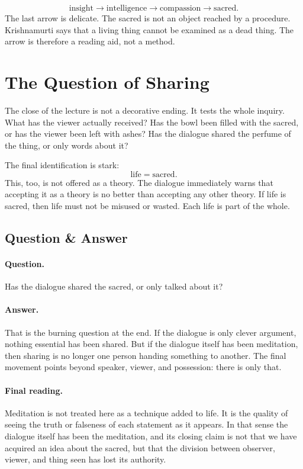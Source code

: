\begin{equation}
\text{insight}
\longrightarrow
\text{intelligence}
\longrightarrow
\text{compassion}
\longrightarrow
\text{sacred}.
\end{equation}
The last arrow is delicate. The sacred is not an object reached by a procedure. Krishnamurti says that a living thing cannot be examined as a dead thing. The arrow is therefore a reading aid, not a method.

\section{The Question of Sharing}

The close of the lecture is not a decorative ending. It tests the whole inquiry. What has the viewer actually received? Has the bowl been filled with the sacred, or has the viewer been left with ashes? Has the dialogue shared the perfume of the thing, or only words about it?

The final identification is stark:
\begin{equation}
\text{life} = \text{sacred}.
\end{equation}
This, too, is not offered as a theory. The dialogue immediately warns that accepting it as a theory is no better than accepting any other theory. If life is sacred, then life must not be misused or wasted. Each life is part of the whole.

\subsection{Question \& Answer}

\paragraph{Question.}
Has the dialogue shared the sacred, or only talked about it?

\paragraph{Answer.}
That is the burning question at the end. If the dialogue is only clever argument, nothing essential has been shared. But if the dialogue itself has been meditation, then sharing is no longer one person handing something to another. The final movement points beyond speaker, viewer, and possession: there is only that.

\paragraph{Final reading.}
Meditation is not treated here as a technique added to life. It is the quality of seeing the truth or falseness of each statement as it appears. In that sense the dialogue itself has been the meditation, and its closing claim is not that we have acquired an idea about the sacred, but that the division between observer, viewer, and thing seen has lost its authority.

